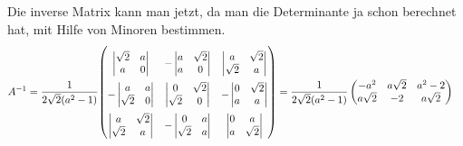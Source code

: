 \begin{loesung}
Die inverse Matrix kann man jetzt, da man die Determinante ja schon berechnet
hat, mit Hilfe von Minoren bestimmen.
\begin{align*}
A^{-1}
&=
\frac1{2\sqrt{2}(a^2-1)}
{\def\arraystretch{2.4}
\begin{pmatrix}
{\def\arraystretch{1}
  \left|\begin{matrix}\sqrt{2}&       a\\       a&       0\end{matrix}\right|}
&{\def\arraystretch{1}
 -\left|\begin{matrix}       a&\sqrt{2}\\       a&       0\end{matrix}\right|}
&{\def\arraystretch{1}
  \left|\begin{matrix}       a&\sqrt{2}\\\sqrt{2}&       a\end{matrix}\right|}
\\
{\def\arraystretch{1}
 -\left|\begin{matrix}       a&       a\\\sqrt{2}&       0\end{matrix}\right|}
&{\def\arraystretch{1}
  \left|\begin{matrix}       0&\sqrt{2}\\\sqrt{2}&       0\end{matrix}\right|}
&{\def\arraystretch{1}
 -\left|\begin{matrix}       0&\sqrt{2}\\       a&       a\end{matrix}\right|}
\\
{\def\arraystretch{1}
  \left|\begin{matrix}       a&\sqrt{2}\\\sqrt{2}&       a\end{matrix}\right|}
&{\def\arraystretch{1}
 -\left|\begin{matrix}       0&       a\\\sqrt{2}&       a\end{matrix}\right|}
&{\def\arraystretch{1}
  \left|\begin{matrix}       0&       a\\       a&\sqrt{2}\end{matrix}\right|}
\end{pmatrix}}
=
\frac1{2\sqrt{2}(a^2-1)}
\begin{pmatrix}
-a^2&a\sqrt{2}&a^2-2\\
a\sqrt{2}&-2&a\sqrt{2}\\

\end{pmatrix}
\end{align*}
\end{loesung}
